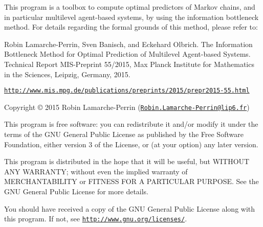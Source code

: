 This program is a toolbox to compute optimal predictors of Markov chains, and in particular multilevel agent-\/based systems, by using the information bottleneck method. For details regarding the formal grounds of this method, please refer to\-:

Robin Lamarche-\/\-Perrin, Sven Banisch, and Eckehard Olbrich. The Information Bottleneck Method for Optimal Prediction of Multilevel Agent-\/based Systems. Technical Report M\-I\-S-\/\-Preprint 55/2015, Max Planck Institute for Mathematics in the Sciences, Leipzig, Germany, 2015.

\href{http://www.mis.mpg.de/publications/preprints/2015/prepr2015-55.html}{\tt http\-://www.\-mis.\-mpg.\-de/publications/preprints/2015/prepr2015-\/55.\-html}

Copyright © 2015 Robin Lamarche-\/\-Perrin (\href{mailto:Robin.Lamarche-Perrin@lip6.fr}{\tt Robin.\-Lamarche-\/\-Perrin@lip6.\-fr})

This program is free software\-: you can redistribute it and/or modify it under the terms of the G\-N\-U General Public License as published by the Free Software Foundation, either version 3 of the License, or (at your option) any later version.

This program is distributed in the hope that it will be useful, but W\-I\-T\-H\-O\-U\-T A\-N\-Y W\-A\-R\-R\-A\-N\-T\-Y; without even the implied warranty of M\-E\-R\-C\-H\-A\-N\-T\-A\-B\-I\-L\-I\-T\-Y or F\-I\-T\-N\-E\-S\-S F\-O\-R A P\-A\-R\-T\-I\-C\-U\-L\-A\-R P\-U\-R\-P\-O\-S\-E. See the G\-N\-U General Public License for more details.

You should have received a copy of the G\-N\-U General Public License along with this program. If not, see \href{http://www.gnu.org/licenses/}{\tt http\-://www.\-gnu.\-org/licenses/}. 